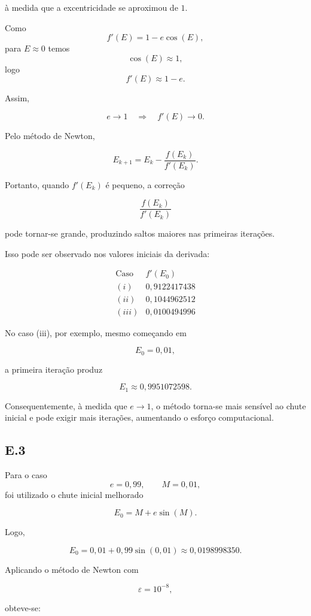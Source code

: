 \documentclass[
	12pt,				%
	openright,			%
	a4paper,			%
	english,			%
	french,				%
	spanish,			%
	brazil,				%
	]{abntex2}
\begin{document}
à medida que a excentricidade se aproximou de $1$.

Como
\[
f'(E)=1-e\cos(E),
\]
para $E\approx0$ temos
\[
\cos(E)\approx1,
\]
logo
\[
f'(E)\approx1-e.
\]

Assim,

\[
e\to1
\quad\Longrightarrow\quad
f'(E)\to0.
\]

Pelo método de Newton,

\[
E_{k+1}
=
E_k-\frac{f(E_k)}{f'(E_k)}.
\]

Portanto, quando $f'(E_k)$ é pequeno, a correção

\[
\frac{f(E_k)}{f'(E_k)}
\]

pode tornar-se grande, produzindo saltos maiores nas primeiras iterações.

Isso pode ser observado nos valores iniciais da derivada:

\[
\begin{array}{c|c}
\text{Caso} & f'(E_0) \\ \hline
(i)   & 0,9122417438 \\
(ii)  & 0,1044962512 \\
(iii) & 0,0100494996
\end{array}
\]

No caso (iii), por exemplo, mesmo começando em

\[
E_0=0,01,
\]

a primeira iteração produz

\[
E_1\approx0,9951072598.
\]

Consequentemente, à medida que $e\to1$, o método torna-se mais sensível ao
chute inicial e pode exigir mais iterações, aumentando o esforço computacional.

\subsection*{E.3}

Para o caso
\[
e=0,99,
\qquad
M=0,01,
\]
foi utilizado o chute inicial melhorado

\[
E_0=M+e\sin(M).
\]

Logo,

\[
E_0
=
0,01+0,99\sin(0,01)
\approx
0,0198998350.
\]

Aplicando o método de Newton com

\[
\varepsilon=10^{-8},
\]

obteve-se:
\end{document}
